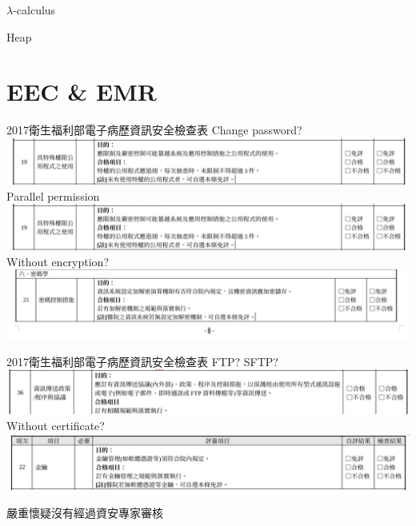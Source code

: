 \documentclass{beamer}
\begin{document}
\begin{CJK*}{UTF8}{bsmi}
\begin{frame}{$\lambda$-calculus}
\begin{beamerboxesrounded}[shadow=true,width=\textwidth]{Heap}
        \end{beamerboxesrounded}
    \end{frame}

    \section{EEC \& EMR}
    \begin{frame}{2017衛生福利部電子病歷資訊安全檢查表}
        Change password?
        \includegraphics[width=\textwidth]{Screenshot_2021-05-11_15-25-16.png}\\
        Parallel permission
        \includegraphics[width=\textwidth]{Screenshot_2021-05-11_15-25-16.png}\\
        Without encryption?
        \includegraphics[width=\textwidth]{Screenshot_2021-05-11_15-23-18.png}
    \end{frame}
    \begin{frame}{2017衛生福利部電子病歷資訊安全檢查表}
        FTP? SFTP?
        \includegraphics[width=\textwidth]{Screenshot_2021-05-11_15-28-25.png}
        Without certificate?
        \includegraphics[width=\textwidth]{Screenshot_2021-05-11_15-24-16.png}
    \end{frame}

    \begin{frame}
        \centering
        \Large
        嚴重懷疑沒有經過資安專家審核
    \end{frame}


\end{CJK*}
\end{document}

